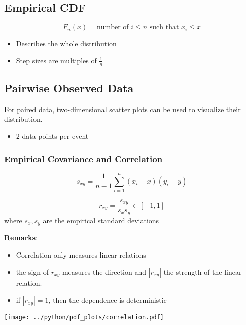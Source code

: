\subsection{Empirical CDF}
\noindent\begin{equation*}
    F_n(x)= \text{number of } i\le n \text{ such that } x_i\le x
\end{equation*}

\begin{itemize}
    \item Describes the whole distribution
    \item Step sizes are multiples of $\frac{1}{n}$
\end{itemize}

\subsection{Pairwise Observed Data}
For paired data, two-dimensional scatter plots can be used to visualize their distribution.

\begin{itemize}
    \item 2 data points per event
\end{itemize}

\subsubsection{Empirical Covariance and Correlation}

\noindent\begin{equation*}
    s_{xy}=\frac{1}{n-1}\sum_{i=1}^n(x_i-\bar{x})(y_i-\bar{y})
\end{equation*}


\noindent\begin{equation*}
    r_{xy}=\frac{s_{xy}}{s_x s_y}\in[-1,1]
\end{equation*}
where $s_x,s_y$ are the empirical standard deviations\

\textbf{Remarks}:
\begin{itemize}
    \item Correlation only measures linear relations
    \item the sign of $r_{xy}$ measures the direction and $|r_{xy}|$ the strength of the linear relation.
    \item if $|r_{xy}|=1$, then the dependence is deterministic
\end{itemize}
\begin{center}
    \texttt{[image: ../python/pdf\_plots/correlation.pdf]}
\end{center}